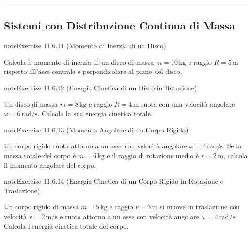 \documentclass[letterpaper,10pt,italian]{jupyterBook}
\begin{document}
\bigskip\hrule\bigskip



\subsection{Sistemi con Distribuzione Continua di Massa}
\label{\detokenize{ch/mechanics/inertia-problems:sistemi-con-distribuzione-continua-di-massa}} \label{exercise:ch/mechanics/inertia-problems-exercise-10}

\begin{sphinxadmonition}{note}{Exercise 11.6.11 (Momento di Inerzia di un Disco)}



\sphinxAtStartPar
Calcola il momento di inerzia di un disco di massa \(m = 10 \, \text{kg}\) e raggio \(R = 5 \, \text{m}\) rispetto all’asse centrale e perpendicolare al piano del disco.
\end{sphinxadmonition}
 \label{exercise:ch/mechanics/inertia-problems-exercise-11}

\begin{sphinxadmonition}{note}{Exercise 11.6.12 (Energia Cinetica di un Disco in Rotazione)}



\sphinxAtStartPar
Un disco di massa \(m = 8 \, \text{kg}\) e raggio \(R = 4 \, \text{m}\) ruota con una velocità angolare \(\omega = 6 \, \text{rad/s}\). Calcola la sua energia cinetica totale.
\end{sphinxadmonition}
 \label{exercise:ch/mechanics/inertia-problems-exercise-12}

\begin{sphinxadmonition}{note}{Exercise 11.6.13 (Momento Angolare di un Corpo Rigido)}



\sphinxAtStartPar
Un corpo rigido ruota attorno a un asse con velocità angolare \(\omega = 4 \, \text{rad/s}\). Se la massa totale del corpo è \(m = 6 \, \text{kg}\) e il raggio di rotazione medio è \(r = 2 \, \text{m}\), calcola il momento angolare del corpo.
\end{sphinxadmonition}
 \label{exercise:ch/mechanics/inertia-problems-exercise-13}

\begin{sphinxadmonition}{note}{Exercise 11.6.14 (Energia Cinetica di un Corpo Rigido in Rotazione e Traslazione)}



\sphinxAtStartPar
Un corpo rigido di massa \(m = 5 \, \text{kg}\) e raggio \(r = 3 \, \text{m}\) si muove in traslazione con velocità \(v = 2 \, \text{m/s}\) e ruota attorno a un asse con velocità angolare \(\omega = 4 \, \text{rad/s}\). Calcola l’energia cinetica totale del corpo.
\end{sphinxadmonition}
 \label{exercise:ch/mechanics/inertia-problems-exercise-14}
\end{document}
